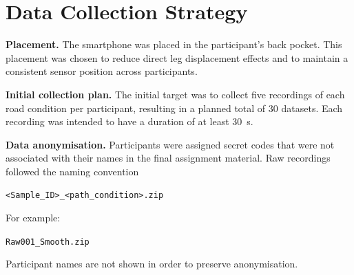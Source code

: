 
\section{Data Collection Strategy}
\label{app:data-collection-plan}

\textbf{Placement.}
The smartphone was placed in the participant's back pocket. This placement was
chosen to reduce direct leg displacement effects and to maintain a consistent
sensor position across participants.

\textbf{Initial collection plan.}
The initial target was to collect five recordings of each road condition per
participant, resulting in a planned total of 30 datasets. Each recording was
intended to have a duration of at least 30~s.

\textbf{Data anonymisation.}
Participants were assigned secret codes that were not associated with their
names in the final assignment material. Raw recordings followed the naming
convention

\begin{center}
\texttt{<Sample\_ID>\_<path\_condition>.zip}
\end{center}

For example:

\begin{center}
\texttt{Raw001\_Smooth.zip}
\end{center}

Participant names are not shown in order to preserve anonymisation.

